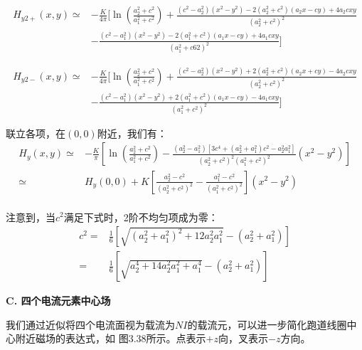 \begin{equation}
\begin{split}
H_{y2+}(x,y)\simeq&-\frac{K}{4\pi}[\ln(\frac{a_{2}^{2}+c^{2}}{a_{1}^{2}+c^{2}})+\frac{(c^{2}-a_{2}^{2})(x^{2}-y^{2})-2(a_{2}^{2}+c^{2})(a_{2}x-cy)+4a_{2}cxy}{(a_{2}^{2}+c^{2})^{2}}\\
&-\frac{(c^{2}-a_{1}^{2})(x^{2}-y^{2})-2(a_{1}^{2}+c^{2})(a_{1}x-cy)+4a_{1}cxy}{(a_{1}^{2}+c6{2})^{2}}]%
\end{split}
\end{equation}

\begin{equation}
\begin{split}
H_{y2-}(x,y)\simeq&-\frac{K}{4\pi}[\ln(\frac{a_{2}^{2}+c^{2}}{a_{1}^{2}+c^{2}})+\frac{(c^{2}-a_{2}^{2})(x^{2}-y^{2})+2(a_{2}^{2}+c^{2})(a_{2}x+cy)-4a_{2}cxy}{(a_{2}^{2}+c^{2})^{2}}\\
&-\frac{(c^{2}-a_{1}^{2})(x^{2}-y^{2})+2(a_{1}^{2}+c^{2})(a_{1}x-cy)-4a_{1}cxy}{(a_{1}^{2}+c^{2})^{2}}]%
\end{split}
\end{equation}

联立各项，在$(0,0)$附近，我们有：
\begin{equation}
\begin{split}
H_{y}(x,y)\simeq&-\frac{K}{\pi}[\ln(\frac{a_{2}^{2}+c^{2}}{a_{1}^{2}+c^{2}})-\frac{(a_{2}^{2}-a_{1}^{2})[3c^{4}+(a_{2}^{2}+a_{1}^{2})c^{2}-a_{2}^{2}a_{1}^{2}]}{(a_{2}^{2}+c^{2})^{2}(a_{1}^{2}+c^{2})^{2}}(x^{2}-y^{2})]\\
\simeq& H_{y}(0,0)+K[\frac{a_{2}^{2}-c^{2}}{(a_{2}^{2}+c^{2})^{2}}-\frac{a_{1}^{2}-c^{2}}{(a_{1}^{2}+c^{2})^{2}}](x^{2}-y^{2})\\%
\end{split}
\end{equation}

注意到，当$c^2$满足下式时，2阶不均匀项成为零：
\begin{equation}
\begin{split}
c^{2}=&\frac{1}{6}[\sqrt{(a_{2}^{2}+a_{1}^{2})^{2}+12a_{2}^{2}a_{1}^{2}}-(a_{2}^{2}+a_{1}^{2})]\\
=&\frac{1}{6}[\sqrt{a_{2}^{4}+14a_{2}^{2}a_{1}^{2}+a_{1}^{4}}-(a_{2}^{2}+a_{1}^{2})]%
\end{split}
\end{equation}

\textbf{C. 四个电流元素中心场}

我们通过近似将四个电流面视为载流为$NI$的载流元，可以进一步简化跑道线圈中心附近磁场的表达式，如
图3.38所示。点表示$+z$向，叉表示$-z$方向。

